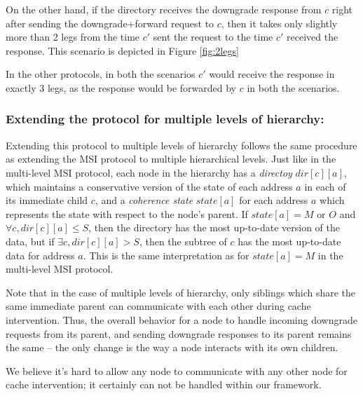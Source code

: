On the other hand, if the directory receives the downgrade response from $c$
right after sending the downgrade+forward request to $c$, then it takes only
slightly more than 2 legs from the time $c'$ sent the request to the time $c'$
received the response. This scenario is depicted in Figure \ref{fig:2legs}

In the other protocols, in both the scenarios $c'$ would receive the response in
exactly 3 legs, as the response would be forwarded by $c$ in both the scenarios.

\subsubsection{Extending the protocol for multiple levels of hierarchy:}
Extending this protocol to multiple levels of hierarchy follows the same
procedure as extending the MSI protocol to multiple hierarchical levels.
Just like in the multi-level MSI protocol, each node in the hierarchy has a
\emph{directoy} $dir[c][a]$, which maintains a conservative version of the
state of each address $a$ in each of its immediate child $c$, and a
\emph{coherence state} $state[a]$ for each address $a$ which represents the
state with respect to the node's parent. If $state[a] = M \text{ or } O$ and
$\forall c, dir[c][a] \le S$, then the directory has the most up-to-date
version of the data, but if $\exists c, dir[c][a] > S$, then the subtree of $c$
has the most up-to-date data for address $a$. This is  the same interpretation
as for $state[a] = M$ in the multi-level MSI protocol.

Note that in the case of multiple levels of hierarchy, only siblings which share
the same immediate parent can communicate with each other during cache
intervention. Thus, the overall behavior for a node to handle incoming downgrade
requests from its parent, and sending downgrade responses to its parent remains
the same -- the only change is the way a node interacts with its own children.

We believe it's hard to allow any node to communicate with any
other node for cache intervention; it certainly can not be handled within our
framework.
